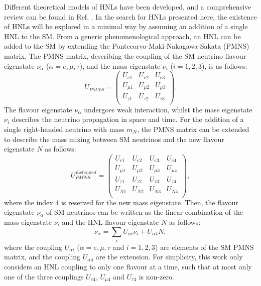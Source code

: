 Different theoretical models of HNLs have been developed, and a comprehensive review can be found in Ref. \cite{HNLWhitePaper}. 
In the search for HNLs presented here, the existence of HNLs will be explored in a minimal way by assuming an addition of a single HNL to the SM.  
From a generic phenomenological approach, an HNL can be added to the SM by extending the Pontecorvo-Maki-Nakagawa-Sakata (PMNS) matrix.
The PMNS matrix, describing the coupling of the SM neutrino flavour eigenstate $\nu_{\alpha}$ ($\alpha=e,\mu,\tau$), and the mass eigenstate $\nu_{i}$ ($i=1,2,3$), is as follows:
\begin{equation}
	U_{PMNS} =
	\begin{pmatrix}
		U_{e1} & U_{e2} & U_{e3}\\
		U_{\mu1} & U_{\mu2} & U_{\mu3}\\
		U_{\tau1} & U_{\tau2} & U_{\tau3}\\
	\end{pmatrix}.
\end{equation}
The flavour eigenstate $\nu_{\alpha}$ undergoes weak interaction, whilst the mass eigenstate $\nu_{i}$ describes the neutrino propagation in space and time.
For the addition of a single right-handed neutrino with mass $m_{N}$, the PMNS matrix can be extended to describe the mass mixing between SM neutrinos and the new flavour eigenstate $N$ as follows:
\begin{equation}
	U_{PMNS}^{Extended} =
	\begin{pmatrix}
		U_{e1} & U_{e2} & U_{e3} & U_{e4}\\
		U_{\mu1} & U_{\mu2} & U_{\mu3} & U_{\mu4}\\
		U_{\tau1} & U_{\tau2} & U_{\tau3} & U_{\tau4}\\
		U_{N1} & U_{N2} & U_{N3} & U_{N4}\\
	\end{pmatrix},
\end{equation}
where the index 4 is reserved for the new mass eigenstate.
Then, the flavour eigenstate  $\nu_{\alpha}$ of SM neutrinos can be written as the linear combination of the mass eigenstate $\nu_{i}$ and the HNL flavour eigenstate $N$ as follows:
\begin{equation}
	\nu_{\alpha}=\sum_i U_{\alpha i}\nu_{i} + U_{\alpha 4}N,
\end{equation}
where the coupling $U_{\alpha i }$ ($\alpha=e,\mu,\tau$ and $i=1,2,3$) are elements of the SM PMNS matrix, and the coupling $U_{\alpha 4}$ are the extension.
For simplicity, this work only considers an HNL coupling to only one flavour at a time, such that at most only one of the three couplings $U_{e4}$, $U_{\mu4}$ and $U_{\tau4}$ is non-zero.

